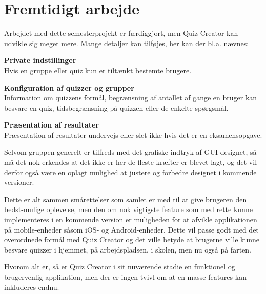\section{Fremtidigt arbejde}

Arbejdet med dette semesterprojekt er færdiggjort, men Quiz Creator kan udvikle sig meget mere. Mange detaljer kan tilføjes, her kan der bl.a. nævnes:

\textbf{Private indstillinger}\\
Hvis en gruppe eller quiz kun er tiltænkt bestemte brugere.

\textbf{Konfiguration af quizzer og grupper}\\
Information om quizzens formål, begrænsning af antallet af gange en bruger kan besvare en quiz, tidsbegrænsning på quizzen eller de enkelte spørgsmål.

\textbf{Præsentation af resultater}\\
Præsentation af resultater undervejs eller slet ikke hvis det er en eksamensopgave.

Selvom gruppen generelt er tilfreds med det grafiske indtryk af GUI-designet, så må det nok erkendes at det ikke er her de fleste kræfter er blevet lagt, og det vil derfor også være en oplagt mulighed at justere og forbedre designet i kommende versioner.

Dette er alt sammen smårettelser som samlet er med til at give brugeren den bedst-mulige oplevelse, men den om nok vigtigste feature som med rette kunne implementeres i en kommende version er muligheden for at afvikle applikationen på mobile-enheder såsom iOS- og Android-enheder. Dette vil passe godt med det overordnede formål med Quiz Creator og det ville betyde at brugerne ville kunne besvare quizzer i hjemmet, på arbejdspladsen, i skolen, men nu også på farten.

Hvorom alt er, så er Quiz Creator i sit nuværende stadie en funktionel og brugervenlig applikation, men der er ingen tvivl om at en masse features kan inkluderes endnu.